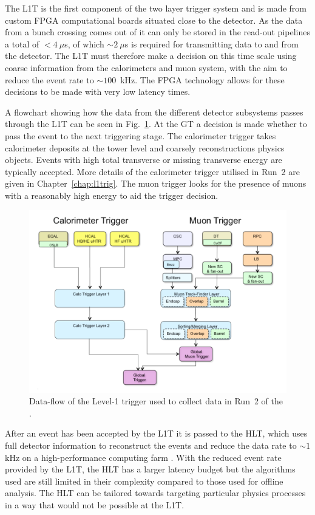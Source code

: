 The \ac{L1T} is the first component of the two layer trigger system
and is made from custom \ac{FPGA} computational boards situated close
to the detector.  As the data from a bunch crossing comes out of \CMS
it can only be stored in the read-out pipelines a total of $<4~\mu$s,
of which $\sim2~\mu$s is required for transmitting data to and from
the detector. The \ac{L1T} must therefore make a decision on this time
scale using coarse information from the calorimeters and muon system,
with the aim to reduce the event rate to $\sim100$~kHz. The
\ac{FPGA} technology allows for these decisions to be made with very
low latency times.

A flowchart showing how the data from the different detector
subsystems passes through the \ac{L1T} can be seen in
Fig.~\ref{fig:l1t}. At the \ac{GT} a decision is made whether to
pass the event to the next triggering stage. The calorimeter trigger
takes calorimeter deposits at the tower level and coarsely
reconstructions physics objects. Events with high total transverse or
missing transverse energy are typically accepted.  More details of the
calorimeter trigger utilised in Run~2 are given in
Chapter~\ref{chap:l1trig}. The muon trigger looks for the presence of
muons with a reasonably high energy to aid the trigger decision.

\begin{figure}
\begin{center}
\includegraphics[width=0.8\linewidth]{figs/cms_triggerflowchart} \end{center}
\caption{ Data-flow of the Level-1 trigger used to collect data in Run~2 of the
\LHC \cite{Tapper:1556311}.}
\label{fig:l1t} \end{figure}

After an event has been accepted by the \ac{L1T} it is passed to the
\ac{HLT}, which uses full detector information to reconstruct the
events and reduce the data rate to $\sim1$kHz on a high-performance
computing farm \cite{Cittolin:578006}.  With the reduced event rate
provided by the \ac{L1T}, the \ac{HLT} has a larger latency budget but
the algorithms used are still limited in their complexity compared to
those used for offline analysis. The \ac{HLT} can be tailored
towards targeting particular physics processes in a way that would not
be possible at the \ac{L1T}.

